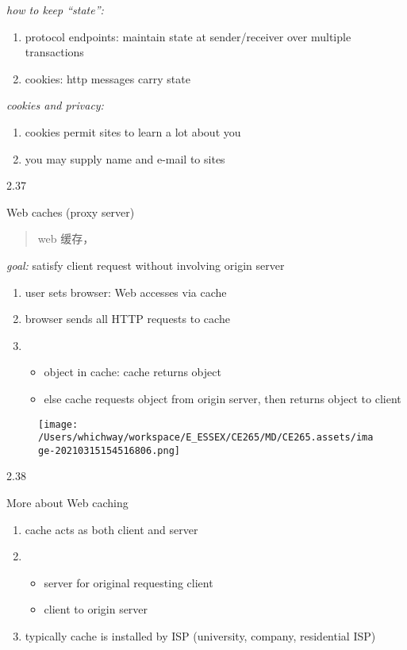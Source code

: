 \documentclass[
]{article}
\begin{document}
\emph{how to keep ``state'':}

\begin{enumerate}
\def\labelenumi{\arabic{enumi}.}
\item
  protocol endpoints: maintain state at sender/receiver over multiple
  transactions
\item
  cookies: http messages carry state
\end{enumerate}

\emph{cookies and privacy:}

\begin{enumerate}
\def\labelenumi{\arabic{enumi}.}
\item
  cookies permit sites to learn a lot about you
\item
  you may supply name and e-mail to sites
\end{enumerate}

2.37

Web caches (proxy server)

\begin{quote}
web 缓存，
\end{quote}

\emph{goal:} satisfy client request without involving origin server

\begin{enumerate}
\def\labelenumi{\arabic{enumi}.}
\item
  user sets browser: Web accesses via cache
\item
  browser sends all HTTP requests to cache
\item
  \begin{itemize}
  \item
    object in cache: cache returns object
  \item
    else cache requests object from origin server, then returns object
    to client
  \end{itemize}
\end{enumerate}

\begin{figure}
\centering
\texttt{[image: /Users/whichway/workspace/E\_ESSEX/CE265/MD/CE265.assets/image-20210315154516806.png]}
\caption{}
\end{figure}

2.38

More about Web caching

\begin{enumerate}
\def\labelenumi{\arabic{enumi}.}
\item
  cache acts as both client and server
\item
  \begin{itemize}
  \item
    server for original requesting client
  \item
    client to origin server
  \end{itemize}
\item
  typically cache is installed by ISP (university, company, residential
  ISP)
\end{enumerate}
\end{document}
